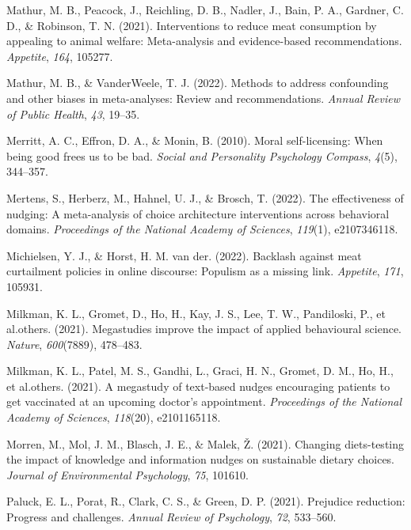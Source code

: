 \documentclass[
  man]{apa6}
\newlength{\cslhangindent}
\newenvironment{CSLReferences}[2] %
 {\begin{list}{}{%
  \setlength{\itemindent}{0pt}
  \setlength{\leftmargin}{0pt}
  \setlength{\parsep}{0pt}
  \ifodd #1
   \setlength{\leftmargin}{\cslhangindent}
   \setlength{\itemindent}{-1\cslhangindent}
  \fi
  \setlength{\itemsep}{#2\baselineskip}}}
 {\end{list}}
\begin{document}
\begin{CSLReferences}{1}{0}
Mathur, M. B., Peacock, J., Reichling, D. B., Nadler, J., Bain, P. A., Gardner, C. D., \& Robinson, T. N. (2021). Interventions to reduce meat consumption by appealing to animal welfare: Meta-analysis and evidence-based recommendations. \emph{Appetite}, \emph{164}, 105277.

Mathur, M. B., \& VanderWeele, T. J. (2022). Methods to address confounding and other biases in meta-analyses: Review and recommendations. \emph{Annual Review of Public Health}, \emph{43}, 19--35.

Merritt, A. C., Effron, D. A., \& Monin, B. (2010). Moral self-licensing: When being good frees us to be bad. \emph{Social and Personality Psychology Compass}, \emph{4}(5), 344--357.

Mertens, S., Herberz, M., Hahnel, U. J., \& Brosch, T. (2022). The effectiveness of nudging: A meta-analysis of choice architecture interventions across behavioral domains. \emph{Proceedings of the National Academy of Sciences}, \emph{119}(1), e2107346118.

Michielsen, Y. J., \& Horst, H. M. van der. (2022). Backlash against meat curtailment policies in online discourse: Populism as a missing link. \emph{Appetite}, \emph{171}, 105931.

Milkman, K. L., Gromet, D., Ho, H., Kay, J. S., Lee, T. W., Pandiloski, P., et al.others. (2021). Megastudies improve the impact of applied behavioural science. \emph{Nature}, \emph{600}(7889), 478--483.

Milkman, K. L., Patel, M. S., Gandhi, L., Graci, H. N., Gromet, D. M., Ho, H., et al.others. (2021). A megastudy of text-based nudges encouraging patients to get vaccinated at an upcoming doctor's appointment. \emph{Proceedings of the National Academy of Sciences}, \emph{118}(20), e2101165118.

Morren, M., Mol, J. M., Blasch, J. E., \& Malek, Ž. (2021). Changing diets-testing the impact of knowledge and information nudges on sustainable dietary choices. \emph{Journal of Environmental Psychology}, \emph{75}, 101610.

Paluck, E. L., Porat, R., Clark, C. S., \& Green, D. P. (2021). Prejudice reduction: Progress and challenges. \emph{Annual Review of Psychology}, \emph{72}, 533--560.


\end{CSLReferences}
\end{document}

